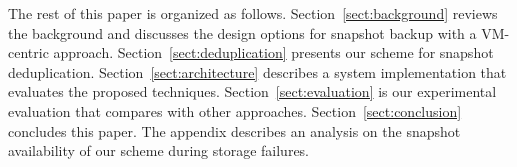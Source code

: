 




The rest of this paper is organized as follows.
Section~\ref{sect:background} reviews the background and discusses the  design options for snapshot backup 
with a VM-centric approach. 
Section~\ref{sect:deduplication}  presents our scheme for  snapshot deduplication. 
Section~\ref{sect:architecture}  describes a system implementation that evaluates the proposed techniques.
Section~\ref{sect:evaluation} is our experimental evaluation that compares with other approaches.
Section~\ref{sect:conclusion}  concludes this paper.
The appendix describes an analysis on the snapshot availability of our scheme during storage failures.
